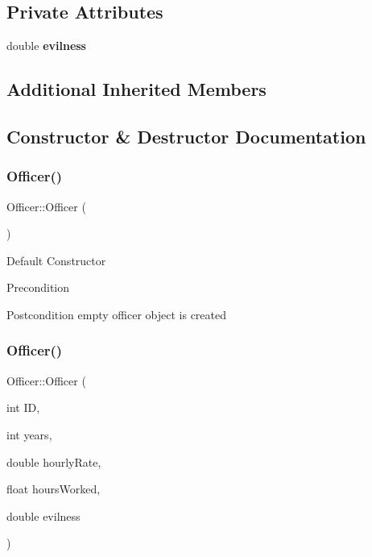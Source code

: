 \subsection*{Private Attributes}
\begin{DoxyCompactItemize}
\item 
\mbox{\label{classOfficer_a63465c5f16e8148e5bc0a3bb4ecd1781}} 
double {\bfseries evilness}
\end{DoxyCompactItemize}
\subsection*{Additional Inherited Members}


\subsection{Constructor \& Destructor Documentation}
\mbox{\label{classOfficer_a80ac1e36a3f36c3a7e12b5dc9320ad89}} 
\subsubsection{\texorpdfstring{Officer()}{Officer()}\hspace{0.1cm}{\footnotesize\ttfamily [1/2]}}
{\footnotesize\ttfamily Officer\+::\+Officer (\begin{DoxyParamCaption}{ }\end{DoxyParamCaption})}

Default Constructor

\begin{DoxyPrecond}{Precondition}

\end{DoxyPrecond}
\begin{DoxyPostcond}{Postcondition}
empty officer object is created 
\end{DoxyPostcond}
\mbox{\label{classOfficer_ac75c45d6e8628606278cb4ce6596f67f}} 
\subsubsection{\texorpdfstring{Officer()}{Officer()}\hspace{0.1cm}{\footnotesize\ttfamily [2/2]}}
{\footnotesize\ttfamily Officer\+::\+Officer (\begin{DoxyParamCaption}\item[{int}]{ID,  }\item[{int}]{years,  }\item[{double}]{hourly\+Rate,  }\item[{float}]{hours\+Worked,  }\item[{double}]{evilness }\end{DoxyParamCaption})}

